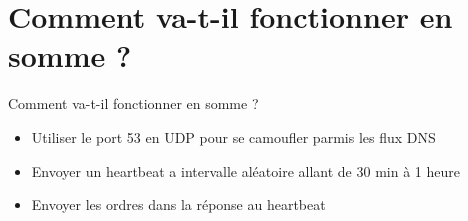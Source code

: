 \documentclass{beamer}
\begin{document}
\section{Comment va-t-il fonctionner en somme ?}
  \begin{frame}{Comment va-t-il fonctionner en somme ?}
  \begin{itemize}
	\item Utiliser le port 53 en UDP pour se camoufler parmis les flux DNS
	\item Envoyer un heartbeat a intervalle aléatoire allant de 30 min à 1 heure
	\item Envoyer les ordres dans la réponse au heartbeat
  \end{itemize}
  \end{frame}
\end{document}
